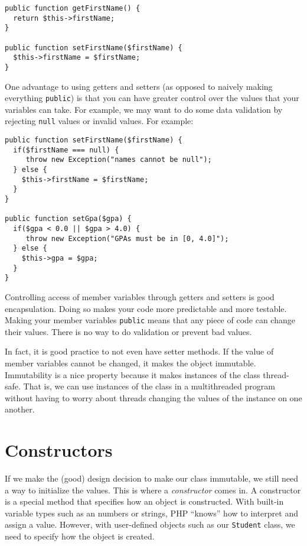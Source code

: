 \begin{verbatim}
public function getFirstName() {
  return $this->firstName;
}

public function setFirstName($firstName) {
  $this->firstName = $firstName;
} 
\end{verbatim}

One advantage to using getters and setters (as opposed to naively
making everything \texttt{public}) is that you can have 
greater control over the values that your variables can take.  For 
example, we may want to do some data validation by rejecting
\texttt{null} values or invalid values.  For example:

\begin{verbatim}
public function setFirstName($firstName) {
  if($firstName === null) {
     throw new Exception("names cannot be null");
  } else {
    $this->firstName = $firstName;
  }
} 

public function setGpa($gpa) {
  if($gpa < 0.0 || $gpa > 4.0) {
     throw new Exception("GPAs must be in [0, 4.0]");
  } else {
    $this->gpa = $gpa;
  }
} 
\end{verbatim}

Controlling access of member variables through getters and setters
is good encapsulation.  Doing so makes your code more predictable and
more testable.  Making your member variables \texttt{public}
means that any piece of code can change their values.  There is no
way to do validation or prevent bad values.  

In fact, it is good practice to not even have setter methods.  If 
the value of member variables cannot be changed, it makes the object
\gls{immutable}.  Immutability is a nice property because it makes 
instances of the class thread-safe.  That is, we can use instances of the class in a multithreaded program without having to worry about threads changing the values of the instance on one another.  

\section{Constructors}

If we make the (good) design decision to make our class immutable,
we still need a way to initialize the values.  This is where 
a \emph{constructor} comes in.  A constructor is a special method
that specifies how an object is constructed.  With built-in
variable types such as an numbers or strings, PHP ``knows'' how to 
interpret and assign a value.  However, with 
user-defined objects such as our \texttt{Student} class, 
we need to specify how the object is created.

